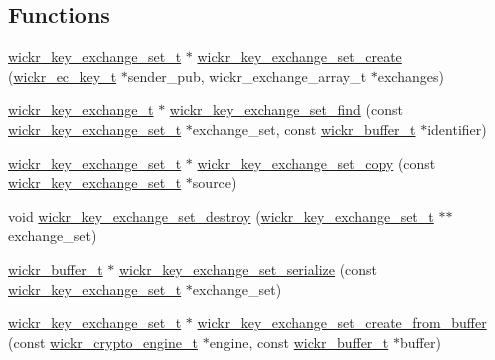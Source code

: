 \subsection*{Functions}
\begin{DoxyCompactItemize}
\item 
\mbox{\hyperlink{structwickr__key__exchange__set}{wickr\+\_\+key\+\_\+exchange\+\_\+set\+\_\+t}} $\ast$ \mbox{\hyperlink{group__wickr__key__exchange__set_ga9d247f82fda4d9ad7cb6784cd591c90e}{wickr\+\_\+key\+\_\+exchange\+\_\+set\+\_\+create}} (\mbox{\hyperlink{structwickr__ec__key}{wickr\+\_\+ec\+\_\+key\+\_\+t}} $\ast$sender\+\_\+pub, wickr\+\_\+exchange\+\_\+array\+\_\+t $\ast$exchanges)
\item 
\mbox{\hyperlink{structwickr__key__exchange}{wickr\+\_\+key\+\_\+exchange\+\_\+t}} $\ast$ \mbox{\hyperlink{group__wickr__key__exchange__set_gae071583943c5c6abe8acc4bcfba032ba}{wickr\+\_\+key\+\_\+exchange\+\_\+set\+\_\+find}} (const \mbox{\hyperlink{structwickr__key__exchange__set}{wickr\+\_\+key\+\_\+exchange\+\_\+set\+\_\+t}} $\ast$exchange\+\_\+set, const \mbox{\hyperlink{structwickr__buffer}{wickr\+\_\+buffer\+\_\+t}} $\ast$identifier)
\item 
\mbox{\hyperlink{structwickr__key__exchange__set}{wickr\+\_\+key\+\_\+exchange\+\_\+set\+\_\+t}} $\ast$ \mbox{\hyperlink{group__wickr__key__exchange__set_ga102baafda8804a97acc5e2a5bc6f7dba}{wickr\+\_\+key\+\_\+exchange\+\_\+set\+\_\+copy}} (const \mbox{\hyperlink{structwickr__key__exchange__set}{wickr\+\_\+key\+\_\+exchange\+\_\+set\+\_\+t}} $\ast$source)
\item 
void \mbox{\hyperlink{group__wickr__key__exchange__set_gadaff24901ec60f83216c03c13bff3e2f}{wickr\+\_\+key\+\_\+exchange\+\_\+set\+\_\+destroy}} (\mbox{\hyperlink{structwickr__key__exchange__set}{wickr\+\_\+key\+\_\+exchange\+\_\+set\+\_\+t}} $\ast$$\ast$exchange\+\_\+set)
\item 
\mbox{\hyperlink{structwickr__buffer}{wickr\+\_\+buffer\+\_\+t}} $\ast$ \mbox{\hyperlink{group__wickr__key__exchange__set_gaf31dcf7493d3eccd4b31b0ff2a79f536}{wickr\+\_\+key\+\_\+exchange\+\_\+set\+\_\+serialize}} (const \mbox{\hyperlink{structwickr__key__exchange__set}{wickr\+\_\+key\+\_\+exchange\+\_\+set\+\_\+t}} $\ast$exchange\+\_\+set)
\item 
\mbox{\hyperlink{structwickr__key__exchange__set}{wickr\+\_\+key\+\_\+exchange\+\_\+set\+\_\+t}} $\ast$ \mbox{\hyperlink{group__wickr__key__exchange__set_gaec93a83e2f00a707caf371b340591324}{wickr\+\_\+key\+\_\+exchange\+\_\+set\+\_\+create\+\_\+from\+\_\+buffer}} (const \mbox{\hyperlink{structwickr__crypto__engine}{wickr\+\_\+crypto\+\_\+engine\+\_\+t}} $\ast$engine, const \mbox{\hyperlink{structwickr__buffer}{wickr\+\_\+buffer\+\_\+t}} $\ast$buffer)
\end{DoxyCompactItemize}


